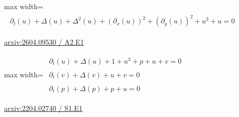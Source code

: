 \documentclass[UTF8,10pt,a4paper,fontset=mac]{ctexart}
\begin{document}
\begin{minipage}{\linewidth}\begin{center}\begin{adjustbox}{max width=\linewidth}$\displaystyle\begin{gathered}\begin{gathered}\partial_{t}(u)+\Delta(u)+\Delta^{2}(u)+(\partial_{x}(u))^{2}+(\partial_{y}(u))^{2}+u^{3}+u=0\end{gathered}\end{gathered}$\end{adjustbox}\end{center}{\small\href{https://arxiv.org/html/2604.09530#A2.E1}{arxiv:2604.09530 / A2.E1}}\par\end{minipage}\par\vspace{6mm}

\begin{minipage}{\linewidth}\begin{center}\begin{adjustbox}{max width=\linewidth}$\displaystyle\begin{gathered}\begin{gathered}\partial_{t}(u)+\Delta(u)+1+u^{3}+p+u+v=0\end{gathered}\\[5pt]\begin{gathered}\partial_{t}(v)+\Delta(v)+u+v=0\end{gathered}\\[5pt]\begin{gathered}\partial_{t}(p)+\Delta(p)+p+u=0\end{gathered}\end{gathered}$\end{adjustbox}\end{center}{\small\href{https://arxiv.org/html/2204.02740#S1.E1}{arxiv:2204.02740 / S1.E1}}\par\end{minipage}\par\vspace{6mm}
\end{document}
